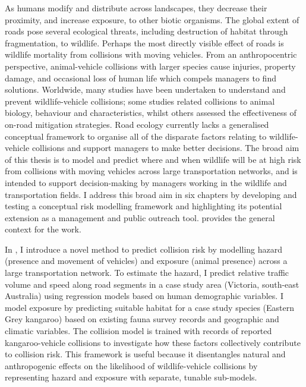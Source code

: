 \documentclass[titlesmallcaps,copyrightpage,examinerscopy]{uomthesis}
\begin{document}
\vspace{1.5cm}
As humans modify and distribute across landscapes, they decrease their proximity, and increase exposure, to other biotic organisms. The global extent of roads pose several ecological threats, including destruction of habitat through fragmentation, to wildlife. Perhaps the most directly visible effect of roads is wildlife mortality from collisions with moving vehicles. From an anthropocentric perspective, animal-vehicle collisions with larger species cause injuries, property damage, and occasional loss of human life which compels managers to find solutions. Worldwide, many studies have been undertaken to understand and prevent wildlife-vehicle collisions; some studies related collisions to animal biology, behaviour and characteristics, whilst others assessed the effectiveness of on-road mitigation strategies. Road ecology currently lacks a generalised conceptual framework to organise all of the disparate factors relating to wildlife-vehicle collisions and support managers to make better decisions. The broad aim of this thesis is to model and predict where and when wildlife will be at high risk from collisions with moving vehicles across large transportation networks, and is intended to support decision-making by managers working in the wildlife and transportation fields. I address this broad aim in six chapters by developing and testing a conceptual risk modelling framework and highlighting its potential extension as a management and public outreach tool.  provides the general context for the work.

In , I introduce a novel method to predict collision risk by modelling hazard (presence and movement of vehicles) and exposure (animal presence) across a large transportation network. To estimate the hazard, I predict relative traffic volume and speed along road segments in a case study area (Victoria, south-east Australia) using regression models based on human demographic variables. I model exposure by predicting suitable habitat for a case study species (Eastern Grey kangaroo) based on existing fauna survey records and geographic and climatic variables. The collision model is trained with records of reported kangaroo-vehicle collisions to investigate how these factors collectively contribute to collision risk. This framework is useful because it disentangles natural and anthropogenic effects on the likelihood of wildlife-vehicle collisions by representing hazard and exposure with separate, tunable sub-models.
\end{document}
